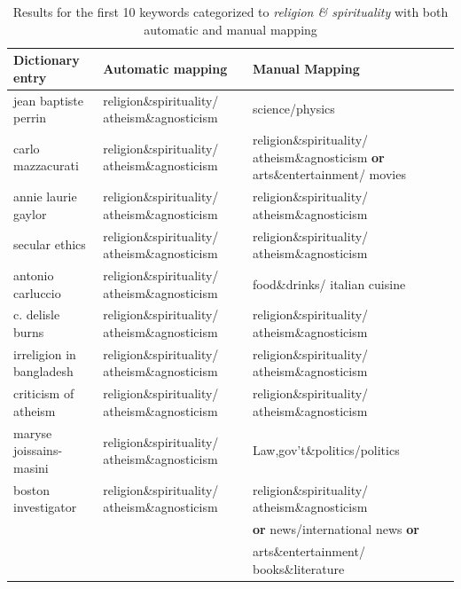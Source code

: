 \begin{table}[h]
\centering
\renewcommand{\arraystretch}{1.25}
\begin{tabularx}{\textwidth}{ l|X|X }
{\bf Dictionary entry}   & {\bf Automatic mapping}                       & {\bf Manual Mapping}                                                                                                  \\ \hline
jean baptiste perrin     & religion\&spirituality/ atheism\&agnosticism & science/physics                                                                                                       \\ \hline
carlo mazzacurati        & religion\&spirituality/ atheism\&agnosticism & religion\&spirituality/ atheism\&agnosticism \textbf{or} arts\&entertainment/ movies                                         \\ \hline
annie laurie gaylor      & religion\&spirituality/ atheism\&agnosticism & religion\&spirituality/
atheism\&agnosticism                                                                         \\ \hline
secular ethics           & religion\&spirituality/ atheism\&agnosticism & religion\&spirituality/ atheism\&agnosticism                                                                         \\ \hline
antonio carluccio        & religion\&spirituality/ atheism\&agnosticism & food\&drinks/ italian cuisine                                                                                        \\ \hline
c. delisle burns         & religion\&spirituality/ atheism\&agnosticism & religion\&spirituality/ atheism\&agnosticism                                                                         \\ \hline
irreligion in bangladesh & religion\&spirituality/ atheism\&agnosticism & religion\&spirituality/ atheism\&agnosticism                                                                         \\ \hline
criticism of atheism     & religion\&spirituality/ atheism\&agnosticism & religion\&spirituality/ atheism\&agnosticism                                                                         \\ \hline
maryse joissains-masini  & religion\&spirituality/ atheism\&agnosticism & Law,gov't\&politics/politics                                                                                       \\ \hline
boston investigator      & religion\&spirituality/ atheism\&agnosticism & religion\&spirituality/ atheism\&agnosticism \\
& & \textbf{or} news/international news \textbf{or} \\
& &  arts\&entertainment/ books\&literature \\ 
\end{tabularx}
\caption[Comparison of manual and automatic mapping, religion]{Results for the first 10 keywords categorized to \emph{religion \& spirituality} with both automatic and manual mapping}
\label{tab:manual_mapping_religion_iab-1}
\end{table}

